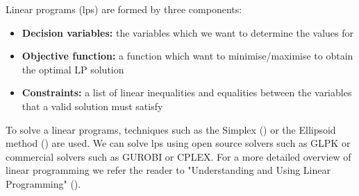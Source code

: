 Linear programs (\acrshort{lp}s) are formed by three components:
\begin{itemize}
    \item \textbf{Decision variables:} the variables which we want to determine the values for
    \item \textbf{Objective function:} a function which want to minimise/maximise to obtain the optimal LP solution 
    \item \textbf{Constraints:} a list of linear inequalities and equalities between the variables that a valid solution must satisfy
\end{itemize}

To solve a linear programs, techniques such as the Simplex (\cite{dantzig_origins_1990}) or the Ellipsoid method (\cite{khachiyan_1979}) are used. We can solve \acrshort{lp}s using open source solvers such as GLPK or commercial solvers such as GUROBI or CPLEX. For a more detailed overview of linear programming we refer the reader to "Understanding and Using Linear Programming" (\cite[see][Chap.~2]{matousek_understanding_2007}).